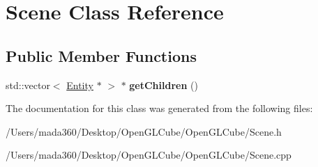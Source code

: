 \hypertarget{class_scene}{}\section{Scene Class Reference}
\label{class_scene}
\subsection*{Public Member Functions}
\begin{DoxyCompactItemize}
\item 
\hypertarget{class_scene_a013d7f5d032bc0920e53083bf3ccaa2c}{}std\+::vector$<$ \hyperlink{class_entity}{Entity} $\ast$ $>$ $\ast$ {\bfseries get\+Children} ()\label{class_scene_a013d7f5d032bc0920e53083bf3ccaa2c}

\end{DoxyCompactItemize}


The documentation for this class was generated from the following files\+:\begin{DoxyCompactItemize}
\item 
/\+Users/mada360/\+Desktop/\+Open\+G\+L\+Cube/\+Open\+G\+L\+Cube/Scene.\+h\item 
/\+Users/mada360/\+Desktop/\+Open\+G\+L\+Cube/\+Open\+G\+L\+Cube/Scene.\+cpp\end{DoxyCompactItemize}
